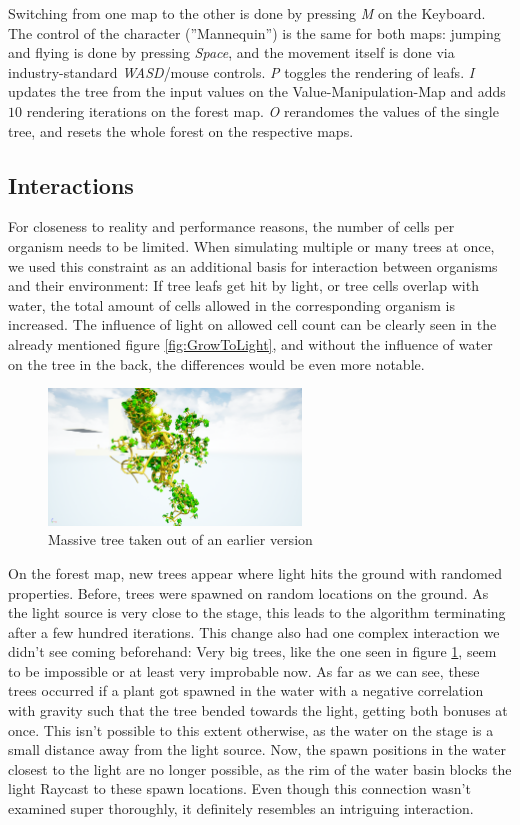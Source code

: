 \documentclass[11pt]{scrartcl}
\begin{document}
Switching from one map to the other is done by pressing \textit{M} on the Keyboard. The control of the character (''Mannequin'') is the same for both maps: jumping and flying is done by pressing \textit{Space}, and the movement itself is done via industry-standard \textit{WASD}/mouse controls. \textit{P} toggles the rendering of leafs. \textit{I} updates the tree from the input values on the Value-Manipulation-Map and adds $10$ rendering iterations on the forest map. \textit{O} rerandomes the values of the single tree, and resets the whole forest on the respective maps.

\subsection{Interactions}

For closeness to reality and performance reasons, the number of cells per organism needs to be limited. When simulating multiple or many trees at once, we used this constraint as an additional basis for interaction between organisms and their environment: If tree leafs get hit by light, or tree cells overlap with water, the total amount of cells allowed in the corresponding organism is increased. The influence of light on allowed cell count can be clearly seen in the already mentioned figure \ref{fig:GrowToLight}, and without the influence of water on the tree in the back, the differences would be even more notable.

\begin{figure}
 	 \centering
 	    \includegraphics[width=0.6\textwidth]{SS_BIGTree.png}
 	 \caption{Massive tree taken out of an earlier version}
 	 \label{fig:BIGTree}
\end{figure}

On the forest map, new trees appear where light hits the ground with randomed properties. Before, trees were spawned on random locations on the ground. As the light source is very close to the stage, this leads to the algorithm terminating after a few hundred iterations. This change also had one complex interaction we didn't see coming beforehand: Very big trees, like the one seen in figure \ref{fig:BIGTree}, seem to be impossible or at least very improbable now. As far as we can see, these trees occurred if a plant got spawned in the water with a negative correlation with gravity such that the tree bended towards the light, getting both bonuses at once. This isn't possible to this extent otherwise, as the water on the stage is a small distance away from the light source. Now, the spawn positions in the water closest to the light are no longer possible, as the rim of the water basin blocks the light Raycast to these spawn locations. Even though this connection wasn't examined super thoroughly, it definitely resembles an intriguing interaction.
\end{document}
